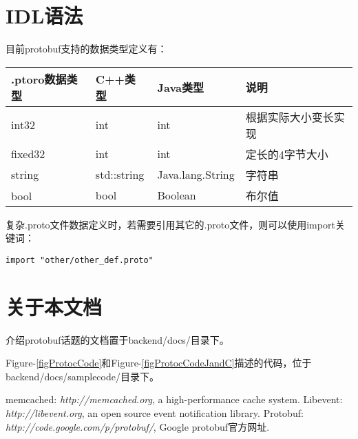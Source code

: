 \documentclass[a4paper]{article}
\begin{document}
\section{IDL语法}
目前protobuf支持的数据类型定义有：

\bgroup
\def\arraystretch{1.15}
\begin{tabular}{|l|l|l|l|}
\hline
{.ptoro数据类型} & {C++类型} & {Java类型} & {说明} \\
\hline
{int32} & {int} & {int} & {根据实际大小变长实现}\\
{fixed32} & {int} & {int} & {定长的4字节大小}\\
{string} & {std::string} & {Java.lang.String} & {字符串}\\
{bool} 　& {bool} & {Boolean} & {布尔值}\\
\hline
\end{tabular}
\egroup

复杂.proto文件数据定义时，若需要引用其它的.proto文件，则可以使用import关键词：
\begin{lstlisting}[frame=none]
import "other/other_def.proto"
\end{lstlisting}


\section{关于本文档}
介绍protobuf话题的文档置于backend/docs/目录下。

Figure-\ref{figProtocCode}和Figure-\ref{figProtocCodeJandC}描述的代码，位于backend/docs/samplecode/目录下。





\begin{thebibliography}{99}
memcached: {\em http://memcached.org}, a high-performance cache system.
 Libevent: {\em http://libevent.org}, an open source event notification library.
Protobuf: {\em  http://code.google.com/p/protobuf/}, Google protobuf官方网址.
\end{thebibliography}
\end{document}
